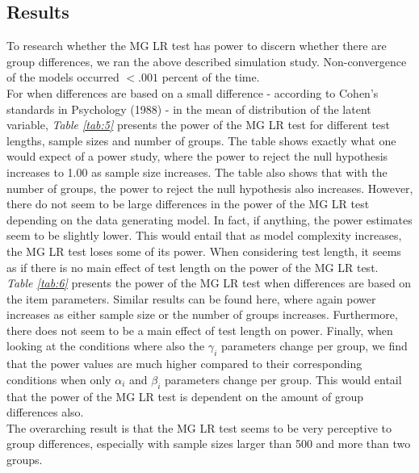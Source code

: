 \documentclass[Royal,sageapa,times,doublespace]{sagej}
\begin{document}
\subsection{Results}

To research whether the MG LR test has power to discern whether there are group differences, we ran the above described simulation study. Non-convergence of the models occurred $<.001$ percent of the time. \\
\indent For when differences are based on a small difference - according to Cohen's standards in Psychology (1988) - in the mean of distribution of the latent variable, \textit{Table \ref{tab:5}} presents the power of the MG LR test for different test lengths, sample sizes and number of groups. The table shows exactly what one would expect of a power study, where the power to reject the null hypothesis increases to 1.00 as sample size increases. The table also shows that with the number of groups, the power to reject the null hypothesis also increases. However, there do not seem to be large differences in the power of the MG LR test depending on the data generating model. In fact, if anything, the power estimates seem to be slightly lower. This would entail that as model complexity increases, the MG LR test loses some of its power. When considering test length, it seems as if there is no main effect of test length on the power of the MG LR test.\\
\indent \textit{Table \ref{tab:6}} presents the power of the MG LR test when differences are based on the item parameters. Similar results can be found here, where again power increases as either sample size or the number of groups increases. Furthermore, there does not seem to be a main effect of test length on power. Finally, when looking at the conditions where also the $\gamma_i$ parameters change per group, we find that the power values are much higher compared to their corresponding conditions when only $\alpha_i$ and $\beta_i$ parameters change per group. This would entail that the power of the MG LR test is dependent on the amount of group differences also. \\
\indent The overarching result is that the MG LR test seems to be very perceptive to group differences, especially with sample sizes larger than 500 and more than two groups.

\newpage 
\end{document}
